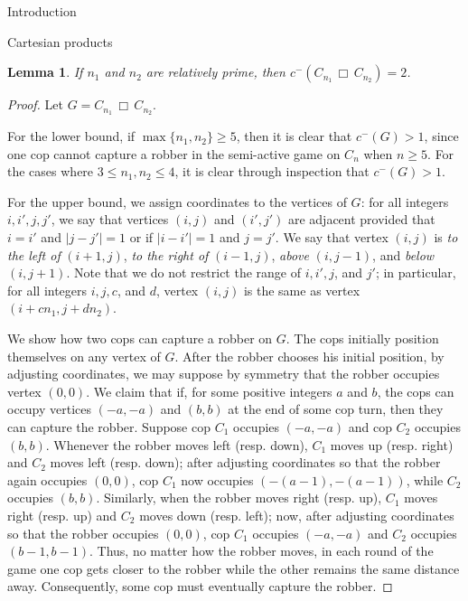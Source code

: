 \documentclass[12pt]{amsart}
\newcommand{\size}[1]{\left \vert #1 \right \vert}
\newtheorem{lemma}{Lemma}[section]
\theoremstyle{definition}
\def\cart{\, \Box \,}
\begin{document}
\begin{section}{Introduction}
\begin{section}{Cartesian products}
%
%
%
%
%


\begin{lemma}\label{lem:rel_prime}
If $n_1$ and $n_2$ are relatively prime, then $c^-(C_{n_1} \cart C_{n_2}) = 2$.
\end{lemma}
\begin{proof}
Let $G = C_{n_1} \cart C_{n_2}$.

For the lower bound, if $\max\{n_1, n_2\} \ge 5$, then it is clear that $c^-(G) > 1$, since one cop cannot capture a robber in the semi-active game on $C_n$ when $n \ge 5$.  For the cases where $3 \le n_1, n_2 \le 4$, it is clear through inspection that $c^-(G) > 1$.

For the upper bound, we assign coordinates to the vertices of $G$: for all integers $i,i',j,j'$, we say that vertices $(i,j)$ and $(i',j')$ are adjacent provided that $i=i'$ and $\size{j-j'} = 1$ or if $\size{i-i'} = 1$ and $j=j'$.  We say that vertex $(i,j)$ is \textit{to the left of} $(i+1,j)$, \textit{to the right of} $(i-1,j)$, \textit{above} $(i,j-1)$, and \textit{below} $(i,j+1)$.  Note that we do not restrict the range of $i, i', j$, and $j'$; in particular, for all integers $i,j,c$, and $d$, vertex $(i,j)$ is the same as vertex $(i+cn_1, j+dn_2)$.

We show how two cops can capture a robber on $G$.  The cops initially position themselves on any vertex of $G$.  After the robber chooses his initial position, by adjusting coordinates, we may suppose by symmetry that the robber occupies vertex $(0,0)$.  We claim that if, for some positive integers $a$ and $b$, the cops can occupy vertices $(-a,-a)$ and $(b,b)$ at the end of some cop turn, then they can capture the robber.  Suppose cop $C_1$ occupies $(-a,-a)$ and cop $C_2$ occupies $(b,b)$.  Whenever the robber moves left (resp. down), $C_1$ moves up (resp. right) and $C_2$ moves left (resp. down); after adjusting coordinates so that the robber again occupies $(0,0)$, cop $C_1$ now occupies $(-(a-1), -(a-1))$, while $C_2$ occupies $(b,b)$.  Similarly, when the robber moves right (resp. up), $C_1$ moves right (resp. up) and $C_2$ moves down (resp. left); now, after adjusting coordinates so that the robber occupies $(0,0)$, cop $C_1$ occupies $(-a,-a)$ and $C_2$ occupies $(b-1,b-1)$.  Thus, no matter how the robber moves, in each round of the game one cop gets closer to the robber while the other remains the same distance away.  Consequently, some cop must eventually capture the robber.


\end{proof}
\end{section}
\end{section}
\end{document}
